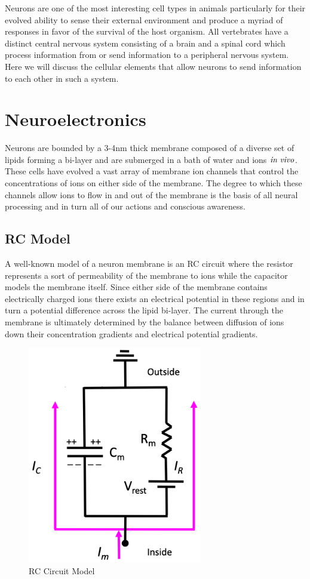 \documentclass[a4paper,11pt]{book}
\begin{document}
Neurons are one of the most interesting cell types in animals particularly for their evolved ability to sense their external environment and produce a myriad of responses in favor of the survival of the host organism. All vertebrates have a distinct central nervous system consisting of a brain and a spinal cord which process information from or send information to a peripheral nervous system. Here we will discuss the cellular elements that allow neurons to send information to each other in such a system.

\section{Neuroelectronics}

Neurons are bounded by a 3-4nm thick membrane composed of a diverse set of lipids forming a bi-layer and are submerged in a bath of water and ions $\it{in \;vivo}$. These cells have evolved a vast array of membrane ion channels that control the concentrations of ions on either side of the membrane. The degree to which these channels allow ions to flow in and out of the membrane is the basis of all neural processing and in turn all of our actions and conscious awareness. 

\subsection{RC Model}

A well-known model of a neuron membrane is an RC circuit where the resistor represents a sort of permeability of the membrane to ions while the capacitor models the membrane itself. Since either side of the membrane contains electrically charged ions there exists an electrical potential in these regions and in turn a potential difference across the lipid bi-layer. The current through the membrane is ultimately determined by the balance between diffusion of ions down their concentration gradients and electrical potential gradients. 

\begin{figure}
\centering
  \includegraphics[width=3in]{assets/circuit-model.png}
  \caption{RC Circuit Model}
  \label{fig:circuit}
\end{figure}
\end{document}
